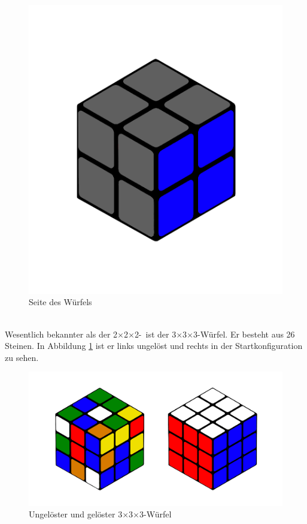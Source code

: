 \documentclass[12pt,a4paper, usenames, dvipsnames]{article}
\theoremstyle{mystyle}
\theoremstyle{definition}
\newcommand{\Ttwo}{2$\times$2$\times$2-}
\newcommand{\Tthree}{3$\times$3$\times$3-}
\begin{document}
\begin{description}
\begin{figure}[h]
\centering
\includegraphics[scale=0.1]{2x2seite.png}
\caption[Seite des Würfels]{Seite des Würfels}
\end{figure}


\item[\Tthree Würfel] \ \\
Wesentlich bekannter als der \Ttwo \ ist der \Tthree Würfel. Er besteht aus 26 Steinen. In Abbildung \ref{Abbildung_3erWürfel} ist er links ungelöst und rechts in der Startkonfiguration zu sehen.

\begin{figure}[h]
\centering
\includegraphics[scale=0.11]{3x3_sc_so.png}
\caption[Ungelöster und gelöster \Tthree Würfel]{Ungelöster und gelöster \Tthree Würfel}
\label{Abbildung_3erWürfel}
\end{figure}


\end{description}
\end{document}
